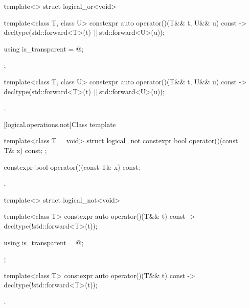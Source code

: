 %
\begin{itemdecl}
template<> struct logical_or<void> {
  template<class T, class U> constexpr auto operator()(T&& t, U&& u) const
    -> decltype(std::forward<T>(t) || std::forward<U>(u));

  using is_transparent = @\unspec@;
};
\end{itemdecl}

%
\begin{itemdecl}
template<class T, class U> constexpr auto operator()(T&& t, U&& u) const
    -> decltype(std::forward<T>(t) || std::forward<U>(u));
\end{itemdecl}

\begin{itemdescr}
\pnum\returns {}.
\end{itemdescr}

[logical.operations.not]{Class template }

%
\begin{itemdecl}
template<class T = void> struct logical_not {
  constexpr bool operator()(const T& x) const;
};
\end{itemdecl}

%
\begin{itemdecl}
constexpr bool operator()(const T& x) const;
\end{itemdecl}

\begin{itemdescr}
\pnum\returns {}.
\end{itemdescr}

%
\begin{itemdecl}
template<> struct logical_not<void> {
  template<class T> constexpr auto operator()(T&& t) const
    -> decltype(!std::forward<T>(t));

  using is_transparent = @\unspec@;
};
\end{itemdecl}

%
\begin{itemdecl}
template<class T> constexpr auto operator()(T&& t) const
    -> decltype(!std::forward<T>(t));
\end{itemdecl}

\begin{itemdescr}
\pnum\returns {}.
\end{itemdescr}


